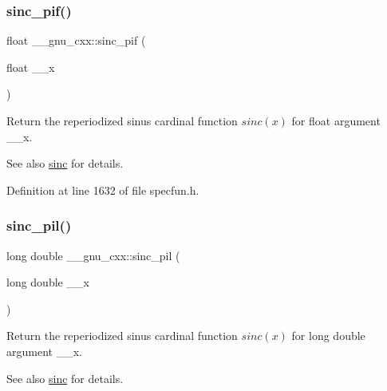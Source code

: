 \subsubsection{\texorpdfstring{sinc\+\_\+pif()}{sinc\_pif()}}
{\footnotesize\ttfamily float \+\_\+\+\_\+gnu\+\_\+cxx\+::sinc\+\_\+pif (\begin{DoxyParamCaption}\item[{float}]{\+\_\+\+\_\+x }\end{DoxyParamCaption})\hspace{0.3cm}{\ttfamily [inline]}}

Return the reperiodized sinus cardinal function $ sinc(x) $ for {\ttfamily float} argument {\ttfamily \+\_\+\+\_\+x}.

\begin{DoxySeeAlso}{See also}
\hyperlink{group__gnu__math__spec__func_ga09976b5d041113979c93613cc3700348}{sinc} for details. 
\end{DoxySeeAlso}


Definition at line 1632 of file specfun.\+h.

\mbox{\label{group__gnu__math__spec__func_gaad38a6e40b1272391a26dbb32a684b3c}} 
\subsubsection{\texorpdfstring{sinc\+\_\+pil()}{sinc\_pil()}}
{\footnotesize\ttfamily long double \+\_\+\+\_\+gnu\+\_\+cxx\+::sinc\+\_\+pil (\begin{DoxyParamCaption}\item[{long double}]{\+\_\+\+\_\+x }\end{DoxyParamCaption})\hspace{0.3cm}{\ttfamily [inline]}}

Return the reperiodized sinus cardinal function $ sinc(x) $ for {\ttfamily long double} argument {\ttfamily \+\_\+\+\_\+x}.

\begin{DoxySeeAlso}{See also}
\hyperlink{group__gnu__math__spec__func_ga09976b5d041113979c93613cc3700348}{sinc} for details. 
\end{DoxySeeAlso}


